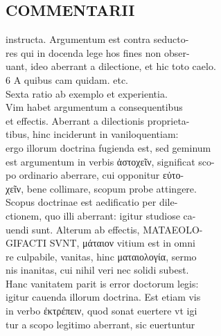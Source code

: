 \documentclass{article}
\begin{document}
\begin{pages}
\section*{COMMENTARII \\
                }
instructa. Argumentum est contra seducto- \\
                res qui in docenda lege hos fines non obser- \\
                uant, ideo aberrant a dilectione, et hic toto caelo. \\
                6 A quibus cam quidam. etc. \\
                Sexta ratio ab exemplo et experientia. \\
                Vim habet argumentum a consequentibus \\
                et effectis. Aberrant a dilectionis proprieta- \\
                tibus, hinc inciderunt in vaniloquentiam: \\
                ergo illorum doctrina fugienda est, sed geminum \\
                est argumentum in verbis ἀστοχεῖν, significat sco- \\
                po ordinario aberrare, cui opponitur εὐτο- \\
                χεῖν, bene collimare, scopum probe attingere. \\
                Scopus doctrinae est aedificatio per dile- \\
                ctionem, quo illi aberrant: igitur studiose ca- \\
                uendi sunt. Alterum ab effectis, MATAEOLO- \\
                GIFACTI SVNT, μάταιον vitium est in omni \\
                re culpabile, vanitas, hinc ματαιολογία, sermo \\
                nis inanitas, cui nihil veri nec solidi subest. \\
                Hanc vanitatem parit is error doctorum legis: \\
                igitur cauenda illorum doctrina. Est etiam vis \\
                in verbo ἐκτρέπειν, quod sonat euertere vt igi \\
                tur a scopo legitimo aberrant, sic euertuntur \\

\end{pages}
\end{document}
